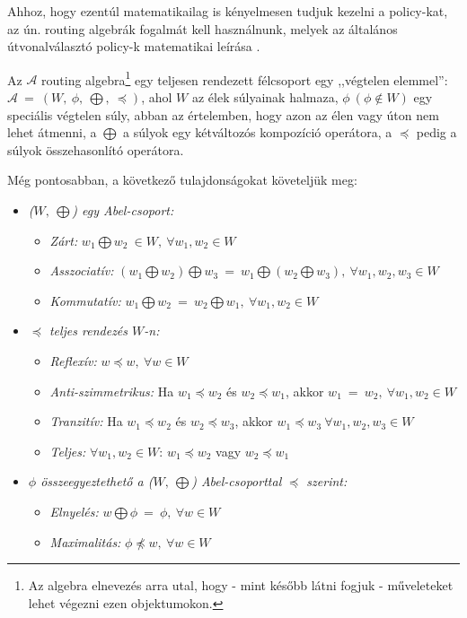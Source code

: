   Ahhoz, hogy ezentúl matematikailag is kényelmesen tudjuk kezelni a policy-kat, az ún. routing algebrák fogalmát kell használnunk, melyek az általános útvonalválasztó policy-k matematikai leírása \cite{Sobrinho_Algebra_and_Algorithms, Compact_Policy_Routing}.

  \begin{definition} 
    Az $\mathcal{A}$ routing algebra\footnote{Az algebra elnevezés arra utal, hogy - mint később látni fogjuk - műveleteket lehet végezni ezen objektumokon.} egy teljesen rendezett félcsoport egy ,,végtelen elemmel'': $\mathcal{A}~=~(W,~\phi,~\bigoplus,~\preceq)$, ahol $W$ az élek súlyainak halmaza, $\phi~(\phi \notin W)$ egy speciális végtelen súly, abban az értelemben, hogy azon az élen vagy úton nem lehet átmenni, a $\bigoplus$ a súlyok egy kétváltozós kompozíció operátora, a $\preceq$ pedig a súlyok összehasonlító operátora.
  \end{definition}

  Még pontosabban, a következő tulajdonságokat követeljük meg:
  \begin{itemize}
    \item \emph{ ($W,~\bigoplus$) egy Abel-csoport:}
    \begin{itemize}
    \item \emph{ Zárt:} $w_{1} \bigoplus w_{2}~\in W, ~\forall w_{1}, w_{2}\in W$
    \item \emph{ Asszociatív:} $(w_{1} \bigoplus w_{2}) \bigoplus w_{3}~=~w_{1} \bigoplus (w_{2} \bigoplus w_{3}),~\forall w_{1}, w_{2}, w_{3}\in W$
    \item \emph{ Kommutatív:} $w_{1} \bigoplus w_{2}~=~w_{2} \bigoplus w_{1},~\forall w_{1}, w_{2}\in W$
    \end{itemize}
    \item \emph{ $\preceq$ teljes rendezés $W$-n:}
    \begin{itemize}
    \item \emph{ Reflexív:} $w \preceq w,~\forall w \in W$
    \item \emph{ Anti-szimmetrikus:} Ha $w_{1} \preceq w_{2}$ és $w_{2} \preceq w_{1}$, akkor $w_{1} ~=~ w_{2},~\forall w_{1}, w_{2} \in W$
    \item \emph{ Tranzitív:} Ha $w_{1} \preceq w_{2}$ és $w_{2} \preceq w_{3}$, akkor $w_{1} \preceq w_{3}~\forall w_{1}, w_{2}, w_{3} \in W$
    \item \emph{ Teljes:} $\forall w_{1}, w_{2} \in W$: $w_{1} \preceq w_{2}$ vagy $w_{2} \preceq w_{1}$
    \end{itemize}
    \item \emph{ $\phi$ összeegyeztethető a ($W,~\bigoplus$) Abel-csoporttal $\preceq$ szerint:}
    \begin{itemize}
    \item \emph{ Elnyelés:} $w \bigoplus \phi ~=~ \phi, ~\forall w \in W$
    \item \emph{ Maximalitás:} $\phi \npreceq w, ~\forall w \in W$
    \end{itemize}
  \end{itemize}

